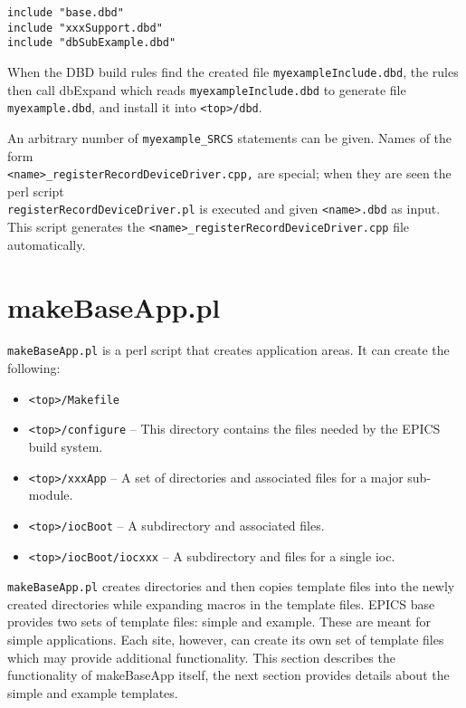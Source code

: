 \begin{verbatim}
include "base.dbd"
include "xxxSupport.dbd"
include "dbSubExample.dbd"
\end{verbatim}

When the DBD build rules find the created file \verb|myexampleInclude.dbd|, the rules then call dbExpand which reads 
\verb|myexampleInclude.dbd| to generate file \verb|myexample.dbd|, and install it into \verb|<top>/dbd|.

An arbitrary number of \verb|myexample_SRCS| statements can be given. Names of the form \\
\verb|<name>_registerRecordDeviceDriver.cpp,| are special; when they are seen the perl script \\
\verb|registerRecordDeviceDriver.pl| is executed and given \verb|<name>.dbd| as input.  This script generates the
\verb|<name>_registerRecordDeviceDriver.cpp| file automatically.

\section{makeBaseApp.pl}

\verb|makeBaseApp.pl| is a perl script that creates application areas. It can create the following:

\begin{itemize}
\item \verb|<top>/Makefile|
\item \verb|<top>/configure| -- This directory contains the files needed by the EPICS build system.
\item \verb|<top>/xxxApp| -- A set of directories and associated files for a  major sub-module.
\item \verb|<top>/iocBoot| -- A subdirectory and associated files.
\item \verb|<top>/iocBoot/iocxxx| -- A subdirectory and files for a single ioc.
\end{itemize}

\verb|makeBaseApp.pl| creates directories and then copies template files into the newly created directories while expanding
macros in the template files. EPICS base provides two sets of template files: simple and example. These are meant for
simple applications. Each site, however, can create its own set of template files which may provide additional
functionality. This section describes the functionality of makeBaseApp itself, the next section provides details about the
simple and example templates.

